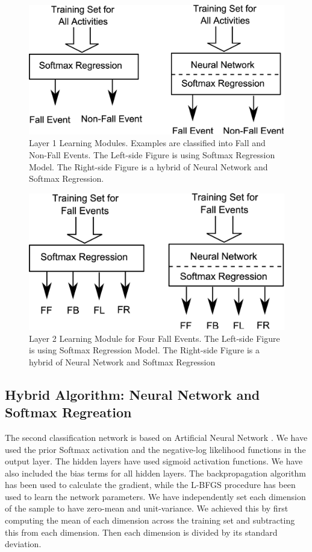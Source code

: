 \documentclass{IEEEtran}
\begin{document}
\begin{figure}[htbp]
	\centering
		\includegraphics[width=0.98\columnwidth]{figures/SoftmaxLayer1.eps}
	\caption{Layer 1 Learning Modules. Examples are classified into Fall and Non-Fall Events.  The Left-side Figure is using Softmax Regression Model. The Right-side Figure is a hybrid of Neural Network and Softmax Regression.}
	\label{fig:SoftmaxLayer1}
\end{figure}

\begin{figure}[htbp]
	\centering
		\includegraphics[width=0.98\columnwidth]{figures/SoftmaxLayer2Fall.eps}
	\caption{Layer 2 Learning Module for Four Fall Events. The Left-side Figure is using Softmax Regression Model. The Right-side Figure is a hybrid of Neural Network and Softmax Regression }
	\label{fig:SoftmaxLayer2Fall}
\end{figure}

\subsection{Hybrid Algorithm: Neural Network and Softmax Regreation}
\label{sec:HybridAlgorithmNeuralNetworkAndSoftmaxRegreation}

The second classification network is based on Artificial Neural Network \cite{Bishop06a}. 
We have used the prior Softmax activation  and the negative-log likelihood 
functions in the output layer. The hidden layers have used sigmoid activation functions. 
We have also included the bias terms for all hidden layers. The backpropagation algorithm 
has been used to calculate the gradient, while the L-BFGS procedure has been used to 
learn the network parameters. We have independently set each dimension of the sample to 
have zero-mean and unit-variance. We achieved this by first computing the mean of each 
dimension across the training set and subtracting this from each dimension. Then each 
dimension is divided by its standard deviation.       
\end{document}
